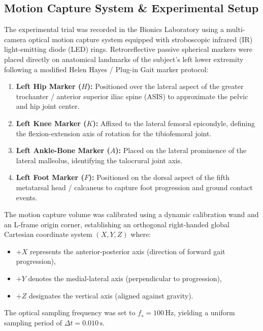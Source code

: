 \documentclass[12pt,a4paper]{article}
\begin{document}
\subsection{Motion Capture System \& Experimental Setup}
The experimental trial was recorded in the Bionics Laboratory using a multi-camera optical motion capture system equipped with stroboscopic infrared (IR) light-emitting diode (LED) rings. Retroreflective passive spherical markers were placed directly on anatomical landmarks of the subject's left lower extremity following a modified Helen Hayes / Plug-in Gait marker protocol:
\begin{enumerate}
    \item \textbf{Left Hip Marker ($H$):} Positioned over the lateral aspect of the greater trochanter / anterior superior iliac spine (ASIS) to approximate the pelvic and hip joint center.
    \item \textbf{Left Knee Marker ($K$):} Affixed to the lateral femoral epicondyle, defining the flexion-extension axis of rotation for the tibiofemoral joint.
    \item \textbf{Left Ankle-Bone Marker ($A$):} Placed on the lateral prominence of the lateral malleolus, identifying the talocrural joint axis.
    \item \textbf{Left Foot Marker ($F$):} Positioned on the dorsal aspect of the fifth metatarsal head / calcaneus to capture foot progression and ground contact events.
\end{enumerate}

The motion capture volume was calibrated using a dynamic calibration wand and an L-frame origin corner, establishing an orthogonal right-handed global Cartesian coordinate system $(X, Y, Z)$ where:
\begin{itemize}
    \item $+X$ represents the anterior-posterior axis (direction of forward gait progression),
    \item $+Y$ denotes the medial-lateral axis (perpendicular to progression),
    \item $+Z$ designates the vertical axis (aligned against gravity).
\end{itemize}
The optical sampling frequency was set to $f_s = 100\,\mathrm{Hz}$, yielding a uniform sampling period of $\Delta t = 0.010\,\mathrm{s}$.
\end{document}
